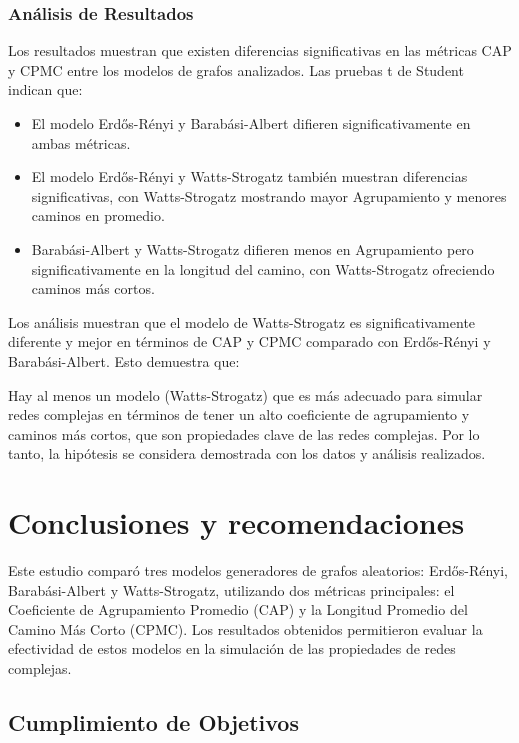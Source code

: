 \documentclass[12pt]{book}
\begin{document}
\subsection{Análisis de Resultados}
Los resultados muestran que existen diferencias significativas en las métricas CAP y CPMC entre los modelos de grafos analizados. Las pruebas t de Student indican que:

\begin{itemize}
    \item El modelo Erdős-Rényi y Barabási-Albert difieren significativamente en ambas métricas.
    \item El modelo Erdős-Rényi y Watts-Strogatz también muestran diferencias significativas, con Watts-Strogatz mostrando mayor Agrupamiento y menores caminos en promedio.
    \item Barabási-Albert y Watts-Strogatz difieren menos en Agrupamiento pero significativamente en la longitud del camino, con Watts-Strogatz ofreciendo caminos más cortos.
    
\end{itemize}

Los análisis muestran que el modelo de Watts-Strogatz es significativamente diferente y mejor en términos de CAP y CPMC comparado con Erdős-Rényi y Barabási-Albert. Esto demuestra que:

Hay al menos un modelo (Watts-Strogatz) que es más adecuado para simular redes complejas en términos de tener un alto coeficiente de agrupamiento y caminos más cortos, que son propiedades clave de las redes complejas.
Por lo tanto, la hipótesis se considera demostrada con los datos y análisis realizados. 

\chapter{Conclusiones y recomendaciones}

Este estudio comparó tres modelos generadores de grafos aleatorios: Erdős-Rényi, Barabási-Albert y Watts-Strogatz, utilizando dos métricas principales: el Coeficiente de Agrupamiento Promedio (CAP) y la Longitud Promedio del Camino Más Corto (CPMC). Los resultados obtenidos permitieron evaluar la efectividad de estos modelos en la simulación de las propiedades de redes complejas.

\section{Cumplimiento de Objetivos}
\end{document}
